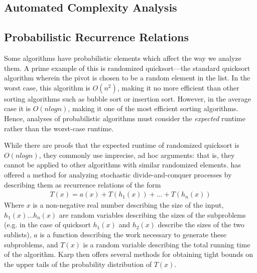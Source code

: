 \subsection{Automated Complexity Analysis}

\subsection{Probabilistic Recurrence Relations}

Some algorithms have probabilistic elements which affect the way we analyze them. A prime example of this is randomized 
quicksort---the standard quicksort algorithm wherein the pivot is chosen to be a random element in the list. In the worst case,
this algorithm is $O(n^2)$, making it no more efficient than other sorting algorithms such as bubble sort or insertion sort. 
However, in the average case it is $O(nlogn)$, making it one of the most efficient sorting algorithms. Hence, analyses of probabilistic algorithms must consider the \emph{expected} runtime rather than the worst-case runtime. 

While there are proofs that the expected runtime of randomized quicksort is $O(nlogn)$, they commonly use
imprecise, ad hoc arguments: that is, they cannot be applied to other algorithms with similar randomized elements. 
has offered a method for analyzing stochastic divide-and-conquer processes by describing them as recurrence relations of the form
\begin{align*}
T(x) = a(x) + T(h_1(x)) + \dots + T(h_n(x))
\end{align*}
Where $x$ is a non-negative real number describing the size of the input, $h_1(x) \dots h_n(x)$ are random variables 
describing the sizes of the subproblems (e.g. in the case of quicksort $h_1(x)$ and $h_2(x)$ describe the sizes of the two 
sublists), $a$ is a function describing the work necessary to generate these subproblems, and $T(x)$ is a random variable 
describing the total running time of the algorithm. Karp then offers several methods for obtaining tight bounds on the upper tails 
of the probability distribution of $T(x)$. 

